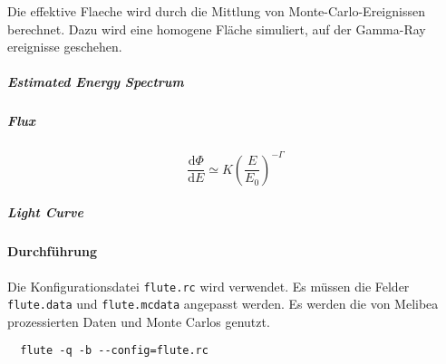 Die effektive Flaeche wird durch die Mittlung von Monte-Carlo-Ereignissen
berechnet.
Dazu wird eine homogene Fläche simuliert, auf der Gamma-Ray ereignisse
geschehen. 

\subparagraph{Estimated Energy Spectrum}
\subparagraph{Flux}

\begin{equation}
\frac{\text{d} \Phi}{\text{d}E} \simeq K {\left( \frac{E}{E_0} \right)}^{- \Gamma}
\end{equation}

\subparagraph{Light Curve}

\paragraph{Durchführung}%

Die Konfigurationsdatei \texttt{flute.rc} wird verwendet.
Es müssen die Felder \texttt{flute.data} und \texttt{flute.mcdata} angepasst werden.
Es werden die von Melibea prozessierten Daten und Monte Carlos genutzt.


\begin{lstlisting}
  flute -q -b --config=flute.rc
\end{lstlisting}
